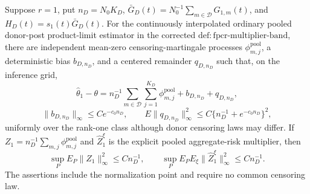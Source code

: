 Suppose \(r=1\), put \(n_D=N_0K_D\), \(\bar G_D(t)=N_0^{-1}\sum_{m\in\mathcal D}G_{1,m}(t)\), and \(H_D(t)=s_1(t)\bar G_D(t)\). For the continuously interpolated ordinary pooled donor-post product-limit estimator in the corrected \(\mathrm{def:fpcr\mbox{-}multiplier\mbox{-}band}\), there are independent mean-zero censoring-martingale processes \(\phi_{m,j}^{\mathrm{pool}}\), a deterministic bias \(b_{D,n_D}\), and a centered remainder \(q_{D,n_D}\) such that, on the inference grid,
\[
 \widehat\theta_1-\theta
 =n_D^{-1}\sum_{m\in\mathcal D}\sum_{j=1}^{K_D}
 \phi_{m,j}^{\mathrm{pool}}+b_{D,n_D}+q_{D,n_D},
\]
\[
 \|b_{D,n_D}\|_\infty\le Ce^{-c_0n_D},
 \qquad E\|q_{D,n_D}\|_\infty^2\le C\{n_D^{-1}+e^{-c_0n_D}\}^2,
\]
uniformly over the rank-one class although donor censoring laws may differ. If \(Z_1=n_D^{-1}\sum_{m,j}\phi_{m,j}^{\mathrm{pool}}\) and \(\widehat Z_1^\xi\) is the explicit pooled aggregate-risk multiplier, then
\[
 \sup_PE_P\|Z_1\|_\infty^2\le Cn_D^{-1},
 \qquad
 \sup_PE_PE_\xi\|\widehat Z_1^\xi\|_\infty^2\le Cn_D^{-1}.
\]
The assertions include the normalization point and require no common censoring law.